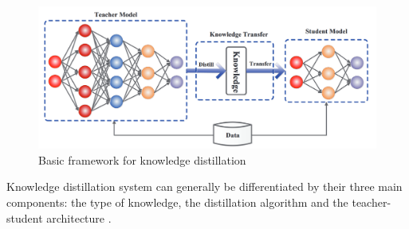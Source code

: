 \documentclass[11pt]{article}
\begin{document}
\begin{figure}[htb]
	\begin{center}
		\includegraphics[width=150mm]{assets/kd}
	\end{center}
	\caption{Basic framework for knowledge distillation \cite{gouKnowledgeDistillationSurvey2021}}
	\label{fig:kd}
\end{figure}

Knowledge distillation system can generally be differentiated by their three main components: the type of knowledge, the distillation algorithm and the teacher-student architecture \cite{gouKnowledgeDistillationSurvey2021}.
\end{document}
